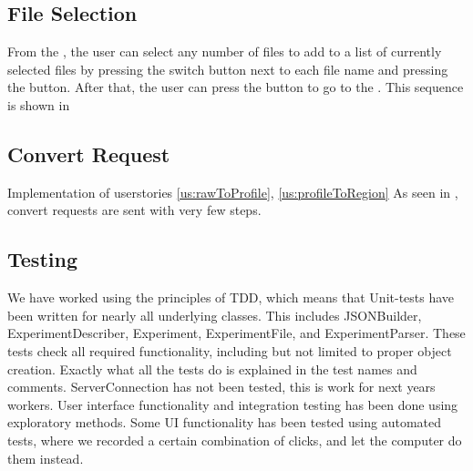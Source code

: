 \subsection{File Selection}

From the , the user can select any number of files to add to a list of currently selected files by pressing the switch button next to each file name and pressing the  button. After that, the user can press the  button to go to the . This sequence is shown in 


\subsection{Convert Request}
Implementation of userstories \ref{us:rawToProfile}, \ref{us:profileToRegion}
As seen in , convert requests are sent with very few steps. 


\subsection{Testing}

We have worked using the principles of TDD, which means that Unit-tests have been written for nearly all underlying classes. This includes JSONBuilder, ExperimentDescriber, Experiment, ExperimentFile, and ExperimentParser. These tests check all required functionality, including but not limited to proper object creation. Exactly what all the tests do is explained in the test names and comments. ServerConnection has not been tested, this is work for next years workers. User interface functionality and integration testing has been done using exploratory methods. Some UI functionality has been tested using automated tests, where we recorded a certain combination of clicks, and let the computer do them instead. 
